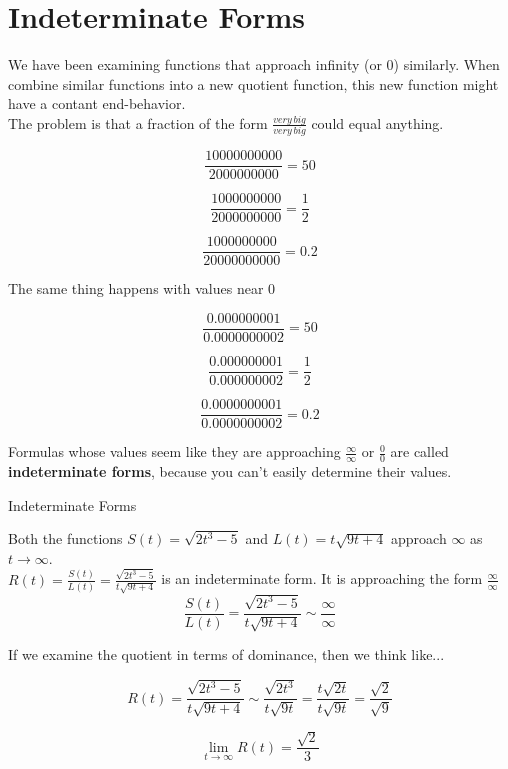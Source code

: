 \documentclass{ximera}
\begin{document}
\section*{Indeterminate Forms}


We have been examining functions that approach infinity (or $0$) similarly. When combine similar functions into a new quotient function, this new function might have a contant end-behavior. \\

The problem is that a fraction of the form $\frac{very \, big}{very \, big}$ could equal anything.



\[  \frac{10000000000}{2000000000} = 50      \]

\[  \frac{1000000000}{2000000000} = \frac{1}{2}      \]

\[  \frac{1000000000}{20000000000} = 0.2      \]





The same thing happens with values near $0$


\[  \frac{0.000000001}{0.0000000002} = 50      \]

\[  \frac{0.000000001}{0.000000002} = \frac{1}{2}      \]

\[  \frac{0.0000000001}{0.0000000002} = 0.2      \]





Formulas whose values seem like they are approaching $\frac{\infty}{\infty}$ or $\frac{0}{0}$ are called \textbf{indeterminate forms}, because you can't easily determine their values.





\begin{example}  Indeterminate Forms

Both the functions $S(t) = \sqrt{2t^3 - 5}$ and $L(t) = t\sqrt{9t+4}$ approach $\infty$ as $t \to \infty$. \\



$R(t) = \frac{S(t)}{L(t)} = \frac{\sqrt{2t^3 - 5}}{t\sqrt{9t+4}}$ is an indeterminate form. It is approaching the form $\frac{\infty}{\infty}$ \\




\[
\frac{S(t)}{L(t)} = \frac{\sqrt{2t^3 - 5}}{t\sqrt{9t+4}} \sim \frac{\infty}{\infty}
\]





If we examine the quotient in terms of dominance, then we think like...

\[
R(t) =  \frac{\sqrt{2t^3 - 5}}{t \sqrt{9t+4}} \sim \frac{\sqrt{2t^3}}{t \sqrt{9t}} = \frac{t \sqrt{2t}}{t \sqrt{9t}} = \frac{\sqrt{2}}{\sqrt{9}}
\]



\[
\lim\limits_{t \to \infty} R(t) = \frac{\sqrt{2}}{3}
\]

\end{example}
\end{document}
